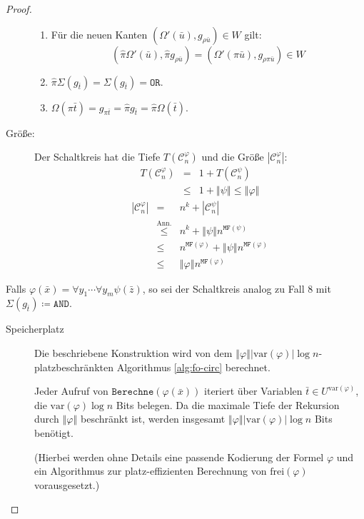 \begin{proof}
\begin{casenv}
\begin{description}
\begin{enumerate}
\item Für die neuen Kanten $\left(\Omega'\left(\bar{u}\right),g_{\rho\bar{u}}\right)\in W$
gilt: 
\[
\left(\hat{\pi}\Omega'\left(\bar{u}\right),\hat{\pi}g_{\rho\bar{u}}\right)=\left(\Omega'\left(\pi\bar{u}\right),g_{\rho\pi\bar{u}}\right)\in W
\]
\item $\hat{\pi}\Sigma\left(g_{\bar{t}}\right)=\Sigma\left(g_{\bar{t}}\right)=\mathtt{OR}$.
\item $\Omega\left(\pi\bar{t}\right)=g_{\pi\bar{t}}=\hat{\pi}g_{\bar{t}}=\hat{\pi}\Omega\left(\bar{t}\right)$.
\end{enumerate}
\item [{Größe:}] Der Schaltkreis hat die Tiefe $T\left(\mathcal{C}_{n}^{\varphi}\right)$
und die Größe $\left|\mathcal{C}_{n}^{\varphi}\right|$:
\begin{eqnarray*}
T\left(\mathcal{C}_{n}^{\varphi}\right) & = & 1+T\left(\mathcal{C}_{n}^{\psi}\right)\\
 & \leqslant & 1+\left\Vert \psi\right\Vert \leqslant\left\Vert \varphi\right\Vert 
\end{eqnarray*}
\begin{eqnarray*}
\left|\mathcal{C}_{n}^{\varphi}\right| & = & n^{k}+\left|\mathcal{C}_{n}^{\psi}\right|\\
 & \overset{\mathrm{Ann.}}{\leqslant} & n^{k}+\left\Vert \psi\right\Vert n^{\mathtt{MF}\left(\psi\right)}\\
 & \leqslant & n^{\mathtt{MF}\left(\varphi\right)}+\left\Vert \psi\right\Vert n^{\mathtt{MF}\left(\varphi\right)}\\
 & \leqslant & \left\Vert \varphi\right\Vert n^{\mathtt{MF}\left(\varphi\right)}
\end{eqnarray*}
\end{description}
\item \label{case:fo-forall}Falls $\varphi\left(\bar{x}\right)=\forall y_{1}\cdots\forall y_{m}\psi\left(\bar{z}\right)$,
so sei der Schaltkreis analog zu Fall 8 mit $\Sigma\left(g_{\bar{t}}\right)\coloneqq\mathtt{AND}$.
\end{casenv}
\begin{description}
\item [{Speicherplatz}] Die beschriebene Konstruktion wird von dem $\left\Vert \varphi\right\Vert \left|\mathrm{var}\left(\varphi\right)\right|\log n$-platzbeschränkten
Algorithmus \ref{alg:fo-circ} berechnet.

Jeder Aufruf von $\mathtt{Berechne}\left(\varphi\left(\bar{x}\right)\right)$
iteriert über Variablen $\bar{t}\in U^{\mathrm{var}\left(\varphi\right)}$,
die $\mathrm{var}\left(\varphi\right)\log n$ Bits belegen. Da die
maximale Tiefe der Rekursion durch $\left\Vert \varphi\right\Vert $
beschränkt ist, werden insgesamt $\left\Vert \varphi\right\Vert \left|\mathrm{var}\left(\varphi\right)\right|\log n$
Bits benötigt.

(Hierbei werden ohne Details eine passende Kodierung der Formel $\varphi$
und ein Algorithmus zur platz-effizienten Berechnung von $\mathrm{frei}\left(\varphi\right)$
vorausgesetzt.)
\end{description}
\end{proof}

